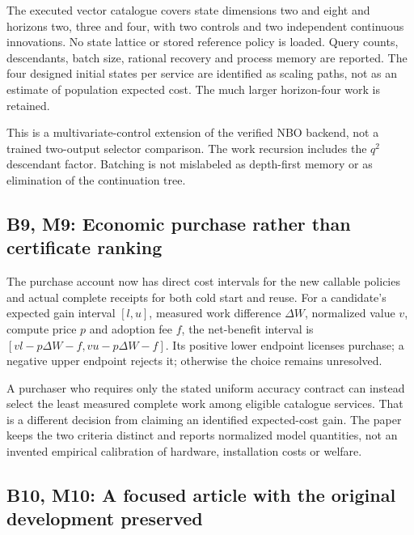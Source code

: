 The executed vector catalogue covers state dimensions two and eight and
horizons two, three and four, with two controls and two independent
continuous innovations. No state lattice or stored reference policy is
loaded. Query counts, descendants, batch size, rational recovery and
process memory are reported. The four designed initial states per
service are identified as scaling paths, not as an estimate of
population expected cost. The much larger horizon-four work is retained.

This is a multivariate-control extension of the verified NBO backend,
not a trained two-output selector comparison. The work recursion
includes the \(q^2\) descendant factor. Batching is not mislabeled as
depth-first memory or as elimination of the continuation tree.

\hypertarget{b9-m9-economic-purchase-rather-than-certificate-ranking}{%
\subsection{B9, M9: Economic purchase rather than certificate
ranking}\label{b9-m9-economic-purchase-rather-than-certificate-ranking}}

The purchase account now has direct cost intervals for the new callable
policies and actual complete receipts for both cold start and reuse. For
a candidate's expected gain interval \([l,u]\), measured work difference
\(\Delta W\), normalized value \(v\), compute price \(p\) and adoption
fee \(f\), the net-benefit interval is
\([vl-p\Delta W-f,vu-p\Delta W-f]\). Its positive lower endpoint
licenses purchase; a negative upper endpoint rejects it; otherwise the
choice remains unresolved.

A purchaser who requires only the stated uniform accuracy contract can
instead select the least measured complete work among eligible catalogue
services. That is a different decision from claiming an identified
expected-cost gain. The paper keeps the two criteria distinct and
reports normalized model quantities, not an invented empirical
calibration of hardware, installation costs or welfare.

\hypertarget{b10-m10-a-focused-article-with-the-original-development-preserved}{%
\subsection{B10, M10: A focused article with the original development
preserved}\label{b10-m10-a-focused-article-with-the-original-development-preserved}}

